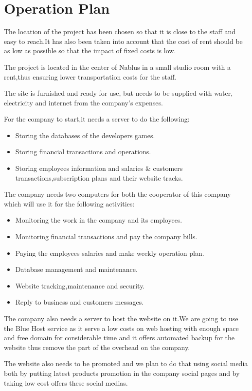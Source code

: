 \documentclass[fontsize=14pt,svgnames]{scrreprt}
\begin{document}
\chapter{Operation Plan}   
The location of the project has been chosen so that it is close to the staff and easy to reach.It has also been taken into account that the cost of rent should be as low as possible so that the impact of fixed costs is low.
\par The project is located in the center of Nablus in a small studio room with a rent,thus ensuring lower transportation costs for the staff.
\par The site is furnished and ready for use, but needs to be supplied with water, electricity and internet from the company's expenses.
\par For the company to start,it needs a server to do the following:
\begin{itemize}
\item Storing the databases of the developers games.
\item Storing financial transactions and operations.
\item Storing employees information and salaries \& customers transactions,subscription plans and their website tracks.  
\end{itemize}  
\par The company needs two computers for both the cooperator of this company which will use it for the following activities:
\begin{itemize}
\item Monitoring the work in the company and its employees.
\item Monitoring financial transactions and pay the company bills.
\item Paying the employees salaries and make weekly operation plan.
\item Database management and maintenance.
\item Website tracking,maintenance and security.
\item Reply to business and customers messages. 
\end{itemize}
The company also needs a server to host the website on it.We are going to use the  Blue Host service as it serve a low costs on web hosting with enough space and free domain for considerable time and it offers automated backup for the website thus remove the part of the overhead on the company.
\par The website also needs to be promoted and we plan to do that using social media both by putting latest products promotion in the company social pages and by taking low cost offers these social medias.
\end{document}
